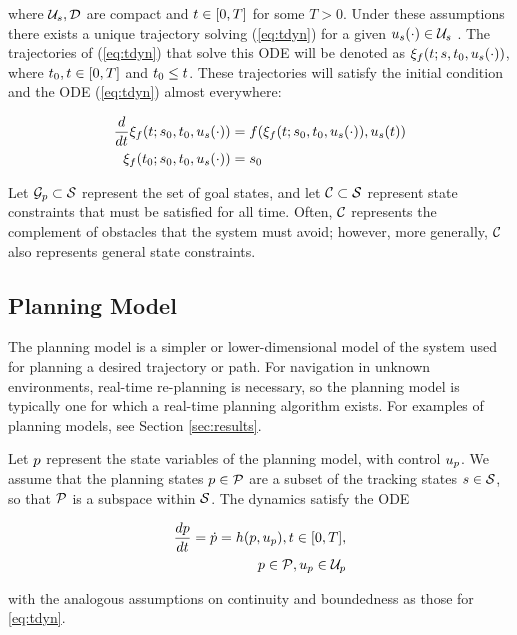 \noindent where $\mathcal{U}_s, \mathcal{D}$ are compact and $t\in[0, T]$ for some $T>0$. Under these assumptions there exists a unique trajectory solving (\ref{eq:tdyn}) for a given $u_s(\cdot) \in \mathcal{U}_s$ \cite{Coddington84}. The trajectories of (\ref{eq:tdyn}) that solve this ODE will be denoted as $\xi_{f}(t; s, t_0, u_s(\cdot))$, where $t_0,t \in [0, T]$ and $t_0 \leq t$. These trajectories will satisfy the initial condition and the ODE (\ref{eq:tdyn}) almost everywhere:

\begin{align*}
\frac{d}{dt}\xi_{f}(t; s_0, t_0, u_s(\cdot)) &= f(\xi_{f}(t; s_0, t_0, u_s(\cdot)), u_s(t)) \\
\xi_{f}(t_0; s_0, t_0, u_s(\cdot)) &= s_0
\end{align*}

Let $\mathcal G_p \subset \mathcal{S}$ represent the set of goal states, and let $\mathcal C \subset \mathcal{S}$ represent state constraints that must be satisfied for all time.
Often, $\mathcal C$ represents the complement of obstacles that the system must avoid; however, more generally, $\mathcal C$ also represents general state constraints.

\subsection{Planning Model \label{sec:planning_model}}
The planning model is a simpler or lower-dimensional model of the system used for planning a desired trajectory or path.
For navigation in unknown environments, real-time re-planning is necessary, so the planning model is typically one for which a real-time planning algorithm exists.
For examples of planning models, see Section \ref{sec:results}.

Let $p$ represent the state variables of the planning model, with control $u_p$. 
We assume that the planning states $p \in \mathcal{P}$ are a subset of the tracking states $s \in \mathcal{S}$, so that $\mathcal{P}$ is a subspace within $\mathcal{S}$. 
The dynamics satisfy the ODE

\begin{align}
\label{eq:pdyn}
\frac{d\pstate}{d\tvar} = \dot{\pstate} = \pdyn(\pstate, \pctrl), \tvar \in [0, \thor], \\
\pstate \in \pset, \pctrl \in \pcset
\end{align}

\noindent with the analogous assumptions on continuity and boundedness as those for \eqref{eq:tdyn}.

